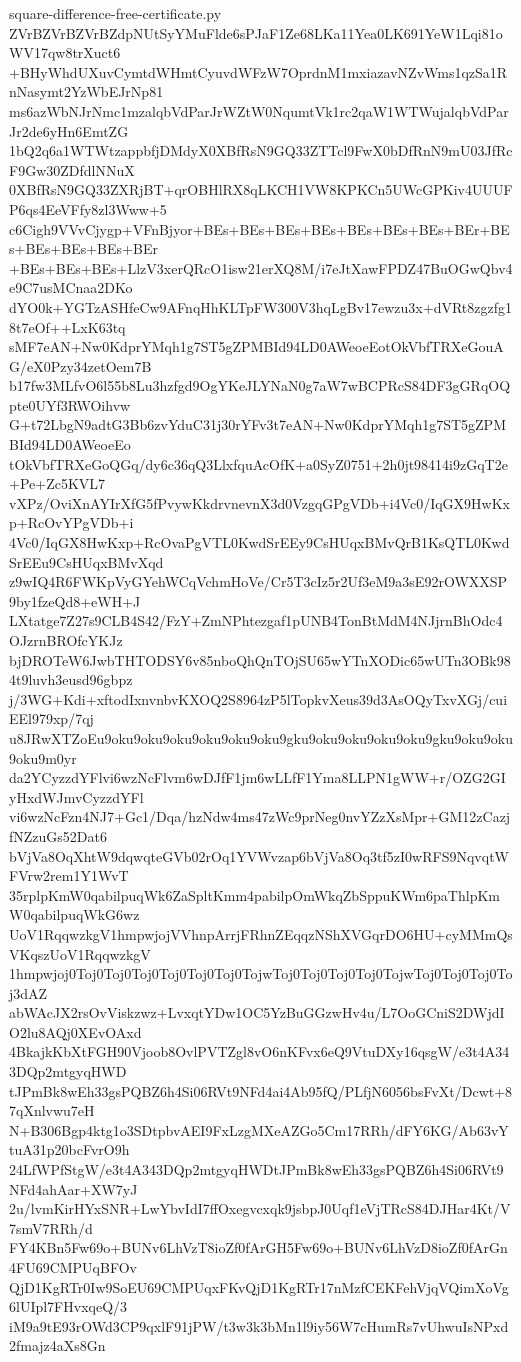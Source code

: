 \documentclass[11pt]{article}
\theoremstyle{definition}
\theoremstyle{remark}
\begin{document}
\begin{filecontents*}[overwrite]{square-difference-free-certificate.py}
ZVrBZVrBZVrBZdpNUtSyYMuFlde6sPJaF1Ze68LKa11Yea0LK691YeW1Lqi81oWV17qw8trXuct6
+BHyWhdUXuvCymtdWHmtCyuvdWFzW7OprdnM1mxiazavNZvWms1qzSa1RnNasymt2YzWbEJrNp81
ms6azWbNJrNmc1mzalqbVdParJrWZtW0NqumtVk1rc2qaW1WTWujalqbVdParJr2de6yHn6EmtZG
1bQ2q6a1WTWtzappbfjDMdyX0XBfRsN9GQ33ZTTcl9FwX0bDfRnN9mU03JfRcF9Gw30ZDfdlNNuX
0XBfRsN9GQ33ZXRjBT+qrOBHlRX8qLKCH1VW8KPKCn5UWcGPKiv4UUUFP6qs4EeVFfy8zl3Www+5
c6Cigh9VVvCjygp+VFnBjyor+BEs+BEs+BEs+BEs+BEs+BEs+BEs+BEr+BEs+BEs+BEs+BEs+BEr
+BEs+BEs+BEs+LlzV3xerQRcO1isw21erXQ8M/i7eJtXawFPDZ47BuOGwQbv4e9C7usMCnaa2DKo
dYO0k+YGTzASHfeCw9AFnqHhKLTpFW300V3hqLgBv17ewzu3x+dVRt8zgzfg18t7eOf++LxK63tq
sMF7eAN+Nw0KdprYMqh1g7ST5gZPMBId94LD0AWeoeEotOkVbfTRXeGouAG/eX0Pzy34zetOem7B
b17fw3MLfvO6l55b8Lu3hzfgd9OgYKeJLYNaN0g7aW7wBCPRcS84DF3gGRqOQpte0UYf3RWOihvw
G+t72LbgN9adtG3Bb6zvYduC31j30rYFv3t7eAN+Nw0KdprYMqh1g7ST5gZPMBId94LD0AWeoeEo
tOkVbfTRXeGoQGq/dy6c36qQ3LlxfquAcOfK+a0SyZ0751+2h0jt98414i9zGqT2e+Pe+Zc5KVL7
vXPz/OviXnAYIrXfG5fPvywKkdrvnevnX3d0VzgqGPgVDb+i4Vc0/IqGX9HwKxp+RcOvYPgVDb+i
4Vc0/IqGX8HwKxp+RcOvaPgVTL0KwdSrEEy9CsHUqxBMvQrB1KsQTL0KwdSrEEu9CsHUqxBMvXqd
z9wIQ4R6FWKpVyGYehWCqVchmHoVe/Cr5T3cIz5r2Uf3eM9a3sE92rOWXXSP9by1fzeQd8+eWH+J
LXtatge7Z27s9CLB4S42/FzY+ZmNPhtezgaf1pUNB4TonBtMdM4NJjrnBhOdc4OJzrnBROfcYKJz
bjDROTeW6JwbTHTODSY6v85nboQhQnTOjSU65wYTnXODic65wUTn3OBk984t9luvh3eusd96gbpz
j/3WG+Kdi+xftodIxnvnbvKXOQ2S8964zP5lTopkvXeus39d3AsOQyTxvXGj/cuiEEl979xp/7qj
u8JRwXTZoEu9oku9oku9oku9oku9oku9oku9gku9oku9oku9oku9oku9gku9oku9oku9oku9m0yr
da2YCyzzdYFlvi6wzNcFlvm6wDJfF1jm6wLLfF1Yma8LLPN1gWW+r/OZG2GIyHxdWJmvCyzzdYFl
vi6wzNcFzn4NJ7+Gc1/Dqa/hzNdw4ms47zWc9prNeg0nvYZzXsMpr+GM12zCazjfNZzuGs52Dat6
bVjVa8OqXhtW9dqwqteGVb02rOq1YVWvzap6bVjVa8Oq3tf5zI0wRFS9NqvqtWFVrw2rem1Y1WvT
35rplpKmW0qabilpuqWk6ZaSpltKmm4pabilpOmWkqZbSppuKWm6paThlpKmW0qabilpuqWkG6wz
UoV1RqqwzkgV1hmpwjojVVhnpArrjFRhnZEqqzNShXVGqrDO6HU+cyMMmQsVKqszUoV1RqqwzkgV
1hmpwjoj0Toj0Toj0Toj0Toj0Toj0Toj0TojwToj0Toj0Toj0Toj0TojwToj0Toj0Toj0Toj3dAZ
abWAcJX2rsOvViskzwz+LvxqtYDw1OC5YzBuGGzwHv4u/L7OoGCniS2DWjdIO2lu8AQj0XEvOAxd
4BkajkKbXtFGH90Vjoob8OvlPVTZgl8vO6nKFvx6eQ9VtuDXy16qsgW/e3t4A343DQp2mtgyqHWD
tJPmBk8wEh33gsPQBZ6h4Si06RVt9NFd4ai4Ab95fQ/PLfjN6056bsFvXt/Dcwt+87qXnlvwu7eH
N+B306Bgp4ktg1o3SDtpbvAEI9FxLzgMXeAZGo5Cm17RRh/dFY6KG/Ab63vYtuA31p20bcFvrO9h
24LfWPfStgW/e3t4A343DQp2mtgyqHWDtJPmBk8wEh33gsPQBZ6h4Si06RVt9NFd4ahAar+XW7yJ
2u/lvmKirHYxSNR+LwYbvIdI7ffOxegvcxqk9jsbpJ0Uqf1eVjTRcS84DJHar4Kt/V7smV7RRh/d
FY4KBn5Fw69o+BUNv6LhVzT8ioZf0fArGH5Fw69o+BUNv6LhVzD8ioZf0fArGn4FU69CMPUqBFOv
QjD1KgRTr0Iw9SoEU69CMPUqxFKvQjD1KgRTr17nMzfCEKFehVjqVQimXoVg6lUIpl7FHvxqeQ/3
iM9a9tE93rOWd3CP9qxlF91jPW/t3w3k3bMn1l9iy56W7cHumRs7vUhwuIsNPxd2fmajz4aXs8Gn

\end{filecontents*}
\end{document}
